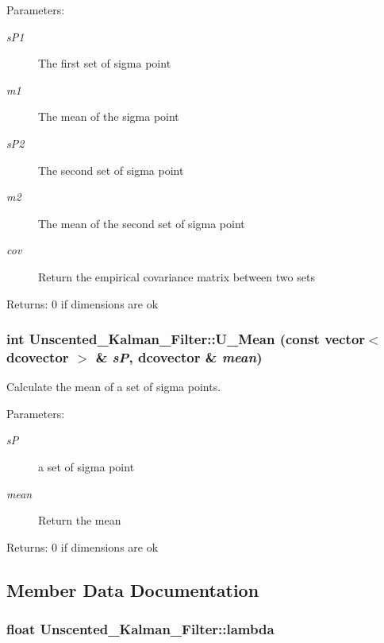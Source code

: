 \begin{Desc}
\item[Parameters:]
\begin{description}
\item[{\em sP1}]The first set of sigma point \item[{\em m1}]The mean of the sigma point \item[{\em sP2}]The second set of sigma point \item[{\em m2}]The mean of the second set of sigma point \item[{\em cov}]Return the empirical covariance matrix between two sets\end{description}
\end{Desc}
\begin{Desc}
\item[Returns:]0 if dimensions are ok \end{Desc}
\hypertarget{class_unscented___kalman___filter_5a6250da8fa76f0f5b22c9030e4ef157}{
\subsubsection[{U\_\-Mean}]{\setlength{\rightskip}{0pt plus 5cm}int Unscented\_\-Kalman\_\-Filter::U\_\-Mean (const vector$<$ dcovector $>$ \& {\em sP}, \/  dcovector \& {\em mean})}}
\label{class_unscented___kalman___filter_5a6250da8fa76f0f5b22c9030e4ef157}


Calculate the mean of a set of sigma points. 

\begin{Desc}
\item[Parameters:]
\begin{description}
\item[{\em sP}]a set of sigma point \item[{\em mean}]Return the mean\end{description}
\end{Desc}
\begin{Desc}
\item[Returns:]0 if dimensions are ok \end{Desc}


\subsection{Member Data Documentation}
\hypertarget{class_unscented___kalman___filter_a160d1820d77b547fee70f25747db2cb}{
\subsubsection[{lambda}]{\setlength{\rightskip}{0pt plus 5cm}float {\bf Unscented\_\-Kalman\_\-Filter::lambda}}}
\label{class_unscented___kalman___filter_a160d1820d77b547fee70f25747db2cb}


